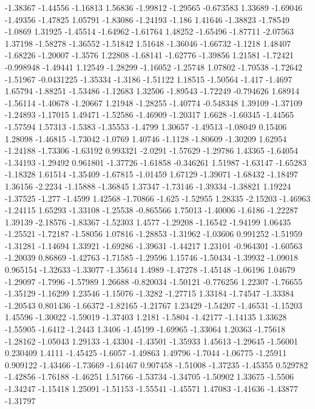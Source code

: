 \documentclass[9pt]{article}
\theoremstyle{plain}
\theoremstyle{definition}
\theoremstyle{remark}
\numberwithin{equation}{section}
\begin{document}
-1.38367
-1.44556
-1.16813
1.56836
-1.99812
-1.29565
-0.673583
1.33689
-1.69046
-1.49356
-1.47825
1.05791
-1.83086
-1.24193
-1.186
1.41646
-1.38823
-1.78549
-1.0869
1.31925
-1.45514
-1.64962
-1.61764
1.48252
-1.65496
-1.87711
-2.07563
1.37198
-1.58278
-1.36552
-1.51842
1.51648
-1.36046
-1.66732
-1.1218
1.48407
-1.68226
-1.20007
-1.3576
1.22808
-1.68141
-1.62776
-1.39856
1.21581
-1.72421
-0.998948
-1.49441
1.12549
-1.28299
-1.16052
-1.25748
1.07802
-1.70538
-1.72642
-1.51967
-0.0431225
-1.35334
-1.3186
-1.51122
1.18515
-1.50564
-1.417
-1.4697
1.65794
-1.88251
-1.53486
-1.12683
1.32506
-1.89543
-1.72249
-0.794626
1.68914
-1.56114
-1.40678
-1.20667
1.21948
-1.28255
-1.40774
-0.548348
1.39109
-1.37109
-1.24893
-1.17015
1.49471
-1.52586
-1.46909
-1.20317
1.6628
-1.60345
-1.44565
-1.57594
1.57313
-1.5383
-1.35553
-1.4799
1.30657
-1.49513
-1.08049
0.15406
1.28098
-1.46815
-1.73042
-1.0769
1.40746
-1.1128
-1.80609
-1.30209
1.62954
-1.24188
-1.73306
-1.63192
0.993321
-2.0291
-1.57629
-1.29786
1.43365
-1.64054
-1.34193
-1.29492
0.961801
-1.37726
-1.61858
-0.346261
1.51987
-1.63147
-1.65283
-1.18328
1.61514
-1.35409
-1.67815
-1.01459
1.67129
-1.39071
-1.68432
-1.18497
1.36156
-2.2234
-1.15888
-1.36845
1.37347
-1.73146
-1.39334
-1.38821
1.19224
-1.37525
-1.277
-1.4599
1.42568
-1.70866
-1.625
-1.52955
1.28335
-2.15203
-1.46963
-1.24115
1.65293
-1.33108
-1.25538
-0.865566
1.75013
-1.40006
-1.6186
-1.22287
1.39139
-2.18576
-1.83367
-1.52303
1.4577
-1.29208
-1.16542
-1.94199
1.06435
-1.25521
-1.72187
-1.58056
1.07816
-1.28853
-1.31962
-1.03606
0.991252
-1.51959
-1.31281
-1.14694
1.33921
-1.69286
-1.39631
-1.44217
1.23101
-0.964301
-1.60563
-1.20039
0.86869
-1.42763
-1.71585
-1.29596
1.15746
-1.50434
-1.39932
-1.09018
0.965154
-1.32633
-1.33077
-1.35614
1.4989
-1.47278
-1.45148
-1.06196
1.04679
-1.29097
-1.7996
-1.57989
1.26688
-0.820034
-1.50121
-0.776256
1.22307
-1.76655
-1.35129
-1.16299
1.23546
-1.15076
-1.3282
-1.27715
1.33184
-1.74547
-1.33384
-1.20543
0.801436
-1.66372
-1.82165
-1.21767
1.23429
-1.54207
-1.46531
-1.15203
1.45596
-1.30022
-1.59019
-1.37403
1.2181
-1.5804
-1.42177
-1.14135
1.33628
-1.55905
-1.6412
-1.2443
1.3406
-1.45199
-1.69965
-1.33064
1.20363
-1.75618
-1.28162
-1.05043
1.29133
-1.43304
-1.43501
-1.35933
1.45613
-1.29645
-1.56001
0.230409
1.4111
-1.45425
-1.6057
-1.49863
1.49796
-1.7044
-1.06775
-1.25911
0.909122
-1.43466
-1.73669
-1.61467
0.907458
-1.51008
-1.37235
-1.45355
0.529782
-1.42856
-1.76188
-1.46251
1.51766
-1.53734
-1.34705
-1.50902
1.33675
-1.5506
-1.34247
-1.15418
1.25091
-1.51153
-1.55541
-1.45571
1.47083
-1.41636
-1.43877
-1.31797
\end{document}

